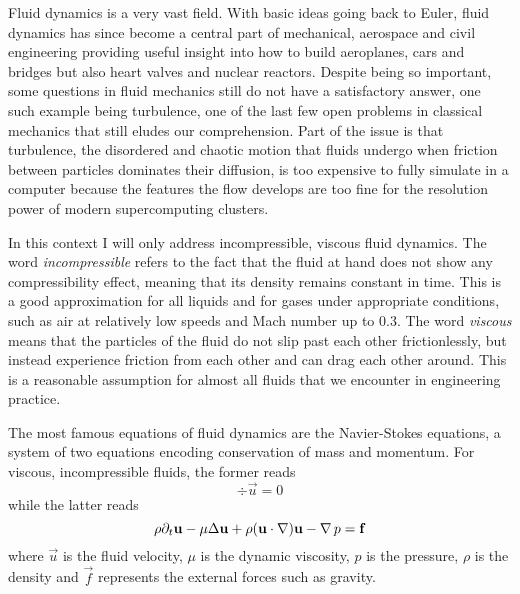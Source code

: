Fluid dynamics is a very vast field.
With basic ideas going back to Euler, fluid dynamics has since become a
central part of mechanical, aerospace and civil engineering providing
useful insight into how to build aeroplanes, cars and bridges but also
heart valves and nuclear reactors.
Despite being so important, some questions in fluid mechanics still do not
have a satisfactory answer, one such example being turbulence, one of the last few
open problems in classical mechanics that still eludes our
comprehension.
Part of the issue is that turbulence, the disordered and chaotic motion that fluids
undergo when friction between particles dominates their diffusion, is too
expensive to fully simulate in a computer because the features the flow
develops are too fine for the resolution power of modern supercomputing
clusters.

In this context I will only address incompressible, viscous fluid
dynamics.
The word \emph{incompressible} refers to the fact that the fluid at hand
does not show any compressibility effect, meaning that its density
remains constant in time.
This is a good approximation for all liquids and for gases under appropriate conditions, such as air at relatively low speeds and Mach number up to \num{0.3}.
The word \emph{viscous} means that the particles of the fluid do not slip
past each other frictionlessly, but instead experience friction from each
other and can drag each other around.
This is a reasonable assumption for almost all fluids that we encounter
in engineering practice.

The most famous equations of fluid dynamics are the Navier-Stokes
equations, a system of two equations encoding conservation of mass and momentum.
For viscous, incompressible fluids, the former reads
\begin{equation}
  \div \vec{u} = 0
  \label{eq_mass}
\end{equation}
while the latter reads
\begin{equation}
  \rho\partial_{t} \mathbf{u} - \mu \Delta \mathbf{u} + \rho(\mathbf{u} \cdot \operatorname{\nabla})
  \mathbf{u} - \operatorname{\nabla} p = \mathbf{f}
  \label{eq_momentum}
\end{equation}
where \(\vec{u}\) is the fluid velocity, \(\mu\) is the dynamic
viscosity, \(p\) is the pressure, \(\rho\) is the density and \(\vec{f}\)
represents the external forces such as gravity.


